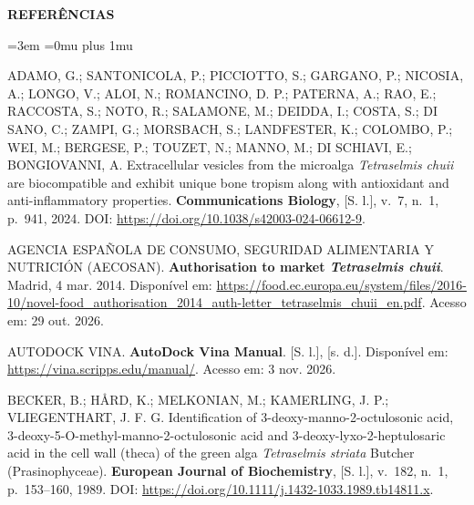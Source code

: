\clearpage
{}
{}
{\centering\bfseries REFERÊNCIAS\par}
\begingroup
\singlespacing
\setlength{\parskip}{\baselineskip}
\setlength{\parindent}{0pt}
\emergencystretch=3em
\sloppy
\RaggedRight
\Urlmuskip=0mu plus 1mu
\begin{samepage}
\filbreak\hypertarget{cite.0@adamo2024}{}ADAMO, G.; SANTONICOLA, P.; PICCIOTTO, S.; GARGANO, P.; NICOSIA, A.; LONGO, V.; ALOI, N.; ROMANCINO, D. P.; PATERNA, A.; RAO, E.; RACCOSTA, S.; NOTO, R.; SALAMONE, M.; DEIDDA, I.; COSTA, S.; DI SANO, C.; ZAMPI, G.; MORSBACH, S.; LANDFESTER, K.; COLOMBO, P.; WEI, M.; BERGESE, P.; TOUZET, N.; MANNO, M.; DI SCHIAVI, E.; BONGIOVANNI, A. Extracellular vesicles from the microalga \textit{Tetraselmis chuii} are biocompatible and exhibit unique bone tropism along with antioxidant and anti-inflammatory properties. \textbf{Communications Biology}, [S. l.], v.~7, n.~1, p.~941, 2024. DOI: \url{https://doi.org/10.1038/s42003-024-06612-9}.
\end{samepage}

\begin{samepage}
\filbreak\hypertarget{cite.0@aecosan2014tetraselmis}{}AGENCIA ESPAÑOLA DE CONSUMO, SEGURIDAD ALIMENTARIA Y NUTRICIÓN (AECOSAN). \textbf{Authorisation to market \textit{Tetraselmis chuii}}. Madrid, 4 mar. 2014. Disponível em: \url{https://food.ec.europa.eu/system/files/2016-10/novel-food_authorisation_2014_auth-letter_tetraselmis_chuii_en.pdf}. Acesso em: 29 out. 2026.
\end{samepage}

\begin{samepage}
\filbreak\hypertarget{cite.0@autodockvina_manual}{}AUTODOCK VINA. \textbf{AutoDock Vina Manual}. [S. l.], [s. d.]. Disponível em: \url{https://vina.scripps.edu/manual/}. Acesso em: 3 nov. 2026.
\end{samepage}

\begin{samepage}
\filbreak\hypertarget{cite.0@becker1989}{}BECKER, B.; HÅRD, K.; MELKONIAN, M.; KAMERLING, J. P.; VLIEGENTHART, J. F. G. Identification of 3-deoxy-manno-2-octulosonic acid, 3-deoxy-5-O-methyl-manno-2-octulosonic acid and 3-deoxy-lyxo-2-heptulosaric acid in the cell wall (theca) of the green alga \textit{Tetraselmis striata} Butcher (Prasinophyceae). \textbf{European Journal of Biochemistry}, [S. l.], v.~182, n.~1, p.~153--160, 1989. DOI: \url{https://doi.org/10.1111/j.1432-1033.1989.tb14811.x}.
\end{samepage}

